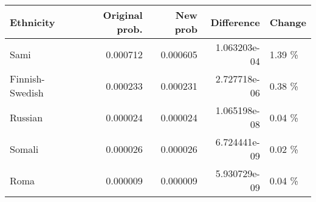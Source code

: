 \begin{tabular}{lrrrl}
\toprule
      Ethnicity &  Original prob. &  New prob &   Difference & Change \\
\midrule
           Sami &        0.000712 &  0.000605 & 1.063203e-04 & 1.39 \% \\
Finnish-Swedish &        0.000233 &  0.000231 & 2.727718e-06 & 0.38 \% \\
        Russian &        0.000024 &  0.000024 & 1.065198e-08 & 0.04 \% \\
         Somali &        0.000026 &  0.000026 & 6.724441e-09 & 0.02 \% \\
           Roma &        0.000009 &  0.000009 & 5.930729e-09 & 0.04 \% \\
\bottomrule
\end{tabular}
